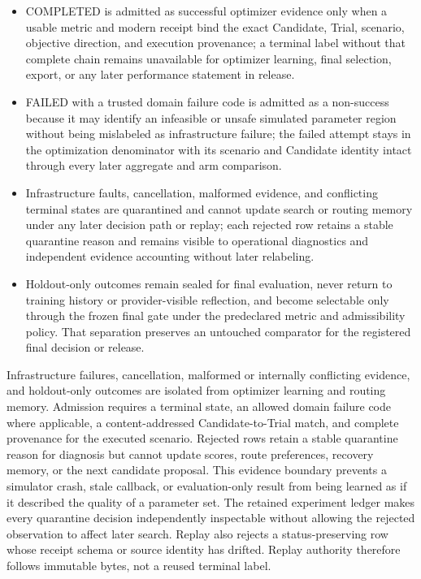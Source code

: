 \begin{itemize}
\item
  COMPLETED is admitted as successful optimizer evidence only when a
  usable metric and modern receipt bind the exact Candidate, Trial,
  scenario, objective direction, and execution provenance; a terminal
  label without that complete chain remains unavailable for optimizer
  learning, final selection, export, or any later performance statement
  in release.
\item
  FAILED with a trusted domain failure code is admitted as a
  non-success because it may identify an infeasible or unsafe simulated
  parameter region without being mislabeled as infrastructure failure;
  the failed attempt stays in the optimization denominator with its
  scenario and Candidate identity intact through every later aggregate
  and arm comparison.
\item
  Infrastructure faults, cancellation, malformed evidence, and
  conflicting terminal states are quarantined and cannot update search
  or routing memory under any later decision path or replay; each rejected
  row retains a stable quarantine reason and remains visible to
  operational diagnostics and independent evidence accounting without
  later relabeling.
\item
  Holdout-only outcomes remain sealed for final evaluation, never return
  to training history or provider-visible reflection, and become
  selectable only through the frozen final gate under the predeclared
  metric and admissibility policy. That separation preserves an untouched
  comparator for the registered final decision or release.
\end{itemize}

Infrastructure failures, cancellation, malformed or internally
conflicting evidence, and holdout-only outcomes are isolated from
optimizer learning and routing memory. Admission requires a terminal
state, an allowed domain failure code where applicable, a
content-addressed Candidate-to-Trial match, and complete provenance for
the executed scenario. Rejected rows retain a stable quarantine reason
for diagnosis but cannot update scores, route preferences, recovery
memory, or the next candidate proposal. This evidence boundary prevents
a simulator crash, stale callback, or evaluation-only result from being
learned as if it described the quality of a parameter set. The retained
experiment ledger makes every quarantine decision independently
inspectable without allowing the rejected observation to affect later search.
Replay also rejects a status-preserving row whose receipt schema or source
identity has drifted. Replay authority therefore follows immutable bytes,
not a reused terminal label.

